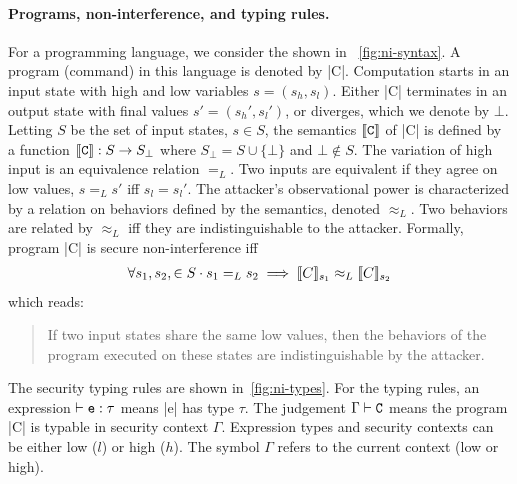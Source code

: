 \paragraph*{Programs, non-interference, and typing rules.}
For a programming language, we consider the  shown in ~\autoref{fig:ni-syntax}.
A program (command) in this language is denoted by \pr|C|.
Computation starts in an input state with high and low variables \(s = (s_h, s_l)\).
Either \pr|C| terminates in an output state with final values \(s' = (s_h', s_l')\), or diverges, which we denote by \(\bot\).
Letting \(S\) be the set of input states, \(s \in S \),
the semantics \(\sem{\text{\pr|C|}}\) of \pr|C| is defined by a function \(\sem{\text{\pr|C|}} : S \rightarrow S_\bot \) where \( S_\bot = S \cup \{ \bot \} \) and \( \bot \notin S\).
The variation of high input is an equivalence relation \(=_L\).
Two inputs are equivalent if they agree on low values, \ie \(s =_L s'\) iff \( s_l = s_l' \).
The attacker's observational power is characterized by a relation on behaviors defined by the semantics, denoted \(\approx_L\).
Two behaviors are related by \(\approx_L\) iff they are indistinguishable to the attacker.
Formally, program \pr|C| is secure \wrt non-interference iff
\begin{align*}
\forall s_1,s_2, \in S \cdot s_1 =_L s_2 \implies \llbracket C\rrbracket_{s_1} \approx_L \llbracket C\rrbracket_{s_2}
\end{align*}
which reads:
\begin{quotation}
\noindent If two input states share the same low values, then the behaviors of the program executed on these states are indistinguishable by the attacker.
\end{quotation}
The security typing rules are shown in~\autoref{fig:ni-types}.
For the typing rules, an expression \(\vdash\prm{e} : \tau\) means \pr|e| has type \(\tau\).
The judgement \(\Gamma\vdash\text{\pr|C|}\) means the program \pr|C| is typable in security context \({\Gamma}\).
Expression types and security contexts can be either low (\({l}\)) or high (\({h}\)).
The symbol \(\Gamma\) refers to the current context (low or high).

